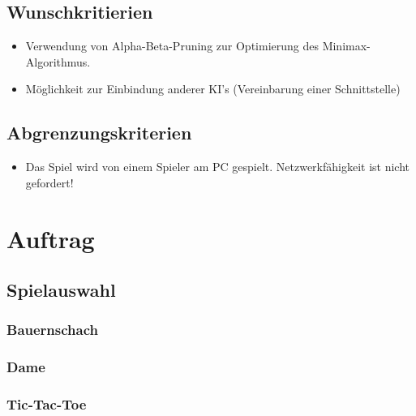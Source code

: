 \documentclass[14pt]{scrartcl}
\begin{document}
\subsection{Wunschkritierien}

\begin{itemize}
    \item Verwendung von Alpha-Beta-Pruning zur Optimierung des Minimax-Algorithmus.
    \item Möglichkeit zur Einbindung anderer KI’s (Vereinbarung einer Schnittstelle)
\end{itemize}


\subsection{Abgrenzungskriterien}

\begin{itemize}
    \item Das Spiel wird von einem Spieler am PC gespielt. Netzwerkfähigkeit ist nicht gefordert!
\end{itemize}


\section{Auftrag}


\subsection{Spielauswahl}
\subsubsection{Bauernschach}
\subsubsection{Dame}
\subsubsection{Tic-Tac-Toe}
\end{document}
